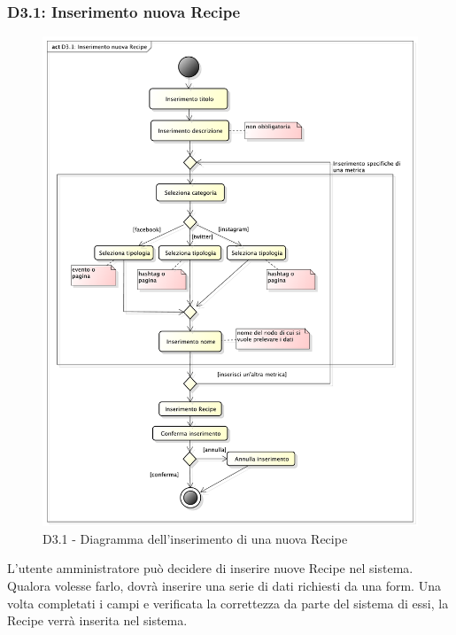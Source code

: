 

		\subsubsection{D3.1: Inserimento nuova Recipe} %
		\label{ssub:inserimento_nuova_recipe}
		\begin{figure}[!htbp]
			\centering
			\centerline{\includegraphics[scale=0.45]{./images/D3_1.pdf}}
			\caption{D3.1 - Diagramma dell'inserimento di una nuova Recipe}
		\end{figure}
		\noindent
		L'utente amministratore può decidere di inserire nuove Recipe nel sistema. Qualora volesse farlo, dovrà inserire una serie di dati richiesti da una form. Una volta completati i campi e verificata la correttezza da parte del sistema di essi, la Recipe verrà inserita nel sistema.

		\pagebreak

